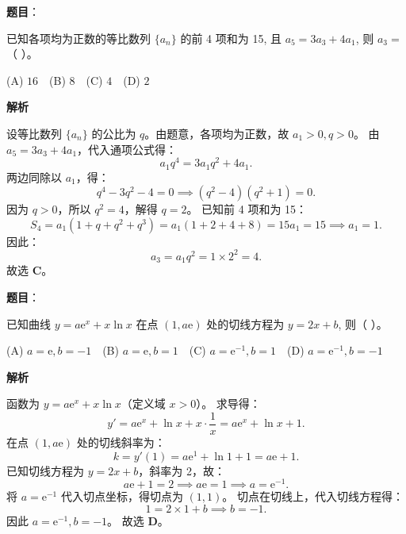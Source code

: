 \begin{answer}

\textbf{题目}：

已知各项均为正数的等比数列 $\{a_n\}$ 的前 4 项和为 15, 且 $a_5 = 3a_3 + 4a_1$, 则 $a_3 =$（ ）。

(A) $16$　(B) $8$　(C) $4$　(D) $2$

\textbf{解析}

设等比数列 $\{a_n\}$ 的公比为 $q$。由题意，各项均为正数，故 $a_1 > 0, q > 0$。
由 $a_5 = 3a_3 + 4a_1$，代入通项公式得：
\nopagebreak[4]
\[a_1 q^4 = 3a_1 q^2 + 4a_1.\]
两边同除以 $a_1$，得：
\nopagebreak[4]
\[q^4 - 3q^2 - 4 = 0 \implies (q^2 - 4)(q^2 + 1) = 0.\]
因为 $q > 0$，所以 $q^2 = 4$，解得 $q = 2$。
已知前 4 项和为 15：
\nopagebreak[4]
\[S_4 = a_1 (1 + q + q^2 + q^3) = a_1 (1 + 2 + 4 + 8) = 15a_1 = 15 \implies a_1 = 1.\]
因此：
\nopagebreak[4]
\[a_3 = a_1 q^2 = 1 \times 2^2 = 4.\]
故选 \textbf{C}。


\end{answer}
\begin{answer}

\textbf{题目}：

已知曲线 $y = a\mathrm{e}^x + x\ln x$ 在点 $(1, a\mathrm{e})$ 处的切线方程为 $y = 2x + b$, 则（ ）。

(A) $a = \mathrm{e}, b = -1$　(B) $a = \mathrm{e}, b = 1$　(C) $a = \mathrm{e}^{-1}, b = 1$　(D) $a = \mathrm{e}^{-1}, b = -1$

\textbf{解析}

函数为 $y = a\mathrm{e}^x + x\ln x$（定义域 $x > 0$）。
求导得：
\nopagebreak[4]
\[y' = a\mathrm{e}^x + \ln x + x \cdot \frac{1}{x} = a\mathrm{e}^x + \ln x + 1.\]
在点 $(1, a\mathrm{e})$ 处的切线斜率为：
\nopagebreak[4]
\[k = y'(1) = a\mathrm{e}^1 + \ln 1 + 1 = a\mathrm{e} + 1.\]
已知切线方程为 $y = 2x + b$，斜率为 2，故：
\nopagebreak[4]
\[a\mathrm{e} + 1 = 2 \implies a\mathrm{e} = 1 \implies a = \mathrm{e}^{-1}.\]
将 $a = \mathrm{e}^{-1}$ 代入切点坐标，得切点为 $(1, 1)$。
切点在切线上，代入切线方程得：
\nopagebreak[4]
\[1 = 2 \times 1 + b \implies b = -1.\]
因此 $a = \mathrm{e}^{-1}, b = -1$。
故选 \textbf{D}。


\end{answer}
